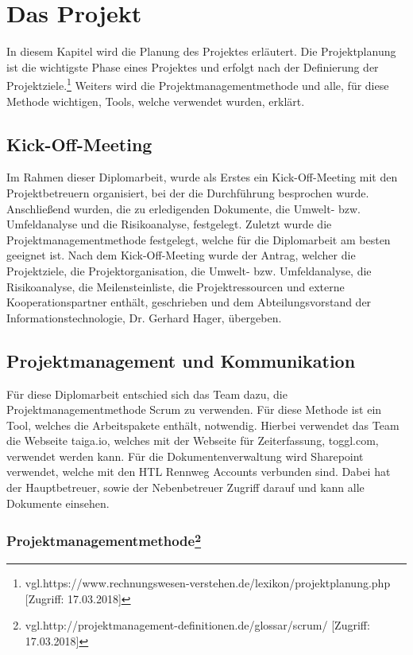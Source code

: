 \chapter{Das Projekt}
\renewcommand{\kapitelautor}{Autor: Hatice Akyokus}
In diesem Kapitel wird die Planung des Projektes erläutert. Die Projektplanung ist die wichtigste Phase eines Projektes und erfolgt nach der Definierung der Projektziele.\footnote{\label{foot:2}vgl.https://www.rechnungswesen-verstehen.de/lexikon/projektplanung.php [Zugriff: 17.03.2018]}   Weiters wird die Projektmanagementmethode und alle, für diese Methode wichtigen, Tools, welche verwendet wurden, erklärt.

\section{Kick-Off-Meeting}

Im Rahmen dieser Diplomarbeit, wurde als Erstes ein Kick-Off-Meeting mit den Projektbetreuern organisiert, bei der die Durchführung besprochen wurde. Anschließend wurden, die zu erledigenden Dokumente, die Umwelt- bzw. Umfeldanalyse und die Risikoanalyse, festgelegt. Zuletzt wurde die Projektmanagementmethode festgelegt, welche für die Diplomarbeit am besten geeignet ist. Nach dem Kick-Off-Meeting wurde der Antrag, welcher die Projektziele, die Projektorganisation, die Umwelt- bzw. Umfeldanalyse, die Risikoanalyse, die Meilensteinliste, die Projektressourcen und externe Kooperationspartner enthält, geschrieben und dem Abteilungsvorstand der Informationstechnologie, Dr. Gerhard Hager, übergeben.

\section{Projektmanagement und Kommunikation}

Für diese Diplomarbeit entschied sich das Team dazu, die Projektmanagementmethode Scrum zu verwenden. Für diese Methode ist ein Tool, welches die Arbeitspakete enthält, notwendig. Hierbei verwendet das Team die Webseite taiga.io, welches mit der Webseite für Zeiterfassung, toggl.com, verwendet werden kann. Für die Dokumentenverwaltung wird Sharepoint verwendet, welche mit den HTL Rennweg Accounts verbunden sind. Dabei hat der Hauptbetreuer, sowie der Nebenbetreuer Zugriff darauf und kann alle Dokumente einsehen.

\subsection[Projektmanagementsmethode]{Projektmanagementmethode\protect\footnote{\label{foot:2}vgl.http://projektmanagement-definitionen.de/glossar/scrum/  [Zugriff: 17.03.2018]}}

